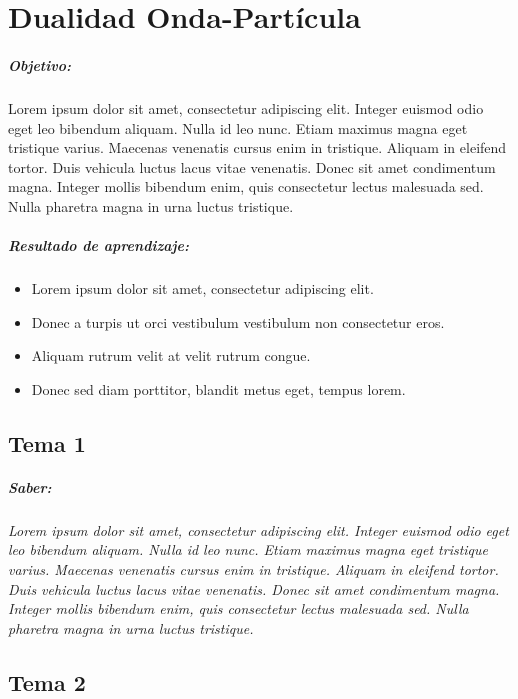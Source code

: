 \chapter{Dualidad Onda-Partícula}
\paragraph{Objetivo:}
Lorem ipsum dolor sit amet, consectetur adipiscing elit. Integer euismod odio eget leo bibendum aliquam. Nulla id leo nunc. Etiam maximus magna eget tristique varius. Maecenas venenatis cursus enim in tristique. Aliquam in eleifend tortor. Duis vehicula luctus lacus vitae venenatis. Donec sit amet condimentum magna. Integer mollis bibendum enim, quis consectetur lectus malesuada sed. Nulla pharetra magna in urna luctus tristique.

\paragraph{Resultado de aprendizaje: }

\begin{itemize}
	\item Lorem ipsum dolor sit amet, consectetur adipiscing elit.
	\item Donec a turpis ut orci vestibulum vestibulum non consectetur eros.
	\item Aliquam rutrum velit at velit rutrum congue.
	\item Donec sed diam porttitor, blandit metus eget, tempus lorem.
\end{itemize}


\section{Tema 1}
\paragraph{Saber: }
\textit{
	Lorem ipsum dolor sit amet, consectetur adipiscing elit. Integer euismod odio eget leo bibendum aliquam. Nulla id leo nunc. Etiam maximus magna eget tristique varius. Maecenas venenatis cursus enim in tristique. Aliquam in eleifend tortor. Duis vehicula luctus lacus vitae venenatis. Donec sit amet condimentum magna. Integer mollis bibendum enim, quis consectetur lectus malesuada sed. Nulla pharetra magna in urna luctus tristique.
}

\section{Tema 2}
